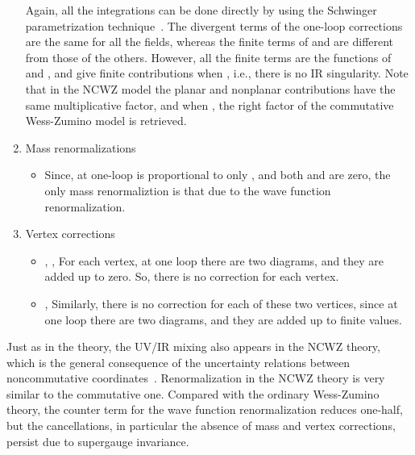\documentclass[a4paper,a4paper]{article}
\begin{document}
\begin{enumerate}
Again, all the integrations can be done directly by using the Schwinger 
parametrization technique~\cite{IZu,Hayakawa}. The divergent terms of the one-loop 
corrections are the same for all the fields, whereas the finite terms of \coordHE{} 
and \coordHE{} are different from those of the others. However, all the finite terms 
are the functions of \coordHE{} and \coordHE{}, and give finite contributions when \coordHE{}, 
i.e., there is no IR singularity. Note that in the NCWZ model the planar and 
nonplanar contributions have the same multiplicative factor, 
and when \coordHE{}, the right factor 
of the commutative Wess-Zumino model is retrieved. 


\item Mass renormalizations
\begin{itemize}
\item Since, at one-loop \coordHE{} is proportional to 
only \coordHE{}, and both \coordHE{} and \coordHE{} are zero, the 
only mass renormaliztion is that due to the wave function renormalization. 
\end{itemize}
\item Vertex corrections
\begin{itemize}
\item {}\coordHE{}, \coordHE{}, \coordHE{}\newline
For each vertex, at one loop there are two diagrams, and they are added up to zero. So,
there is no correction for each vertex.
\item {}\coordHE{}, 
\coordHE{} \newline  
Similarly, there is no correction for each of these two vertices, since at one loop there 
are two diagrams, and they are added up to finite values.
\end{itemize}
\end{enumerate}

Just as in the \coordHE{} theory, the UV/IR mixing also appears in the NCWZ theory, 
which is the general consequence of 
the uncertainty relations between noncommutative coordinates~\cite{SW}. 
Renormalization in the NCWZ theory is very similar
to the commutative one. Compared with the ordinary
Wess-Zumino theory, the counter term for the wave function renormalization
reduces one-half, but the cancellations, in particular the absence
of mass and vertex corrections, persist due to supergauge invariance. 
\end{document}
